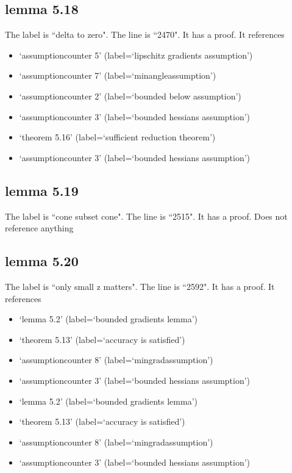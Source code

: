 \documentclass{article}
\begin{document}
\subsection{lemma 5.18}
The label is ``delta to zero".
The line is ``2470".
It has a proof.
It references \begin{itemize}
\item `assumptioncounter 5' (label=`lipschitz gradients assumption')
\item `assumptioncounter 7' (label=`minangleassumption')
\item `assumptioncounter 2' (label=`bounded below assumption')
\item `assumptioncounter 3' (label=`bounded hessians assumption')
\item `theorem 5.16' (label=`sufficient reduction theorem')
\item `assumptioncounter 3' (label=`bounded hessians assumption')
\end{itemize}
\subsection{lemma 5.19}
The label is ``cone subset cone".
The line is ``2515".
It has a proof.
Does not reference anything
\subsection{lemma 5.20}
The label is ``only small z matters".
The line is ``2592".
It has a proof.
It references \begin{itemize}
\item `lemma 5.2' (label=`bounded gradients lemma')
\item `theorem 5.13' (label=`accuracy is satisfied')
\item `assumptioncounter 8' (label=`mingradassumption')
\item `assumptioncounter 3' (label=`bounded hessians assumption')
\item `lemma 5.2' (label=`bounded gradients lemma')
\item `theorem 5.13' (label=`accuracy is satisfied')
\item `assumptioncounter 8' (label=`mingradassumption')
\item `assumptioncounter 3' (label=`bounded hessians assumption')
\end{itemize}
\end{document}

